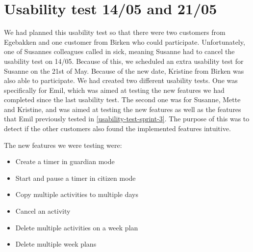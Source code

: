 \section{Usability test 14/05 and 21/05}\label{usability-test-14-05}
We had planned this usability test so that there were two customers from Egebakken and one customer from Birken who could participate.
Unfortunately, one of Susannes colleagues called in sick, meaning Susanne had to cancel the usability test on 14/05.
Because of this, we scheduled an extra usability test for Susanne on the 21st of May. 
Because of the new date, Kristine from Birken was also able to participate. 
We had created two different usability tests. 
One was specifically for Emil, which was aimed at testing the new features we had completed since the last usability test.
The second one was for Susanne, Mette and Kristine, and was aimed at testing the new features as well as the features that Emil previously tested in \autoref{usability-test-sprint-3}. 
The purpose of this was to detect if the other customers also found the implemented features intuitive.

The new features we were testing were:

\begin{itemize}
  \item Create a timer in guardian mode
  \item Start and pause a timer in citizen mode
  \item Copy multiple activities to multiple days
  \item Cancel an activity
  \item Delete multiple activities on a week plan
  \item Delete multiple week plans
\end{itemize}


